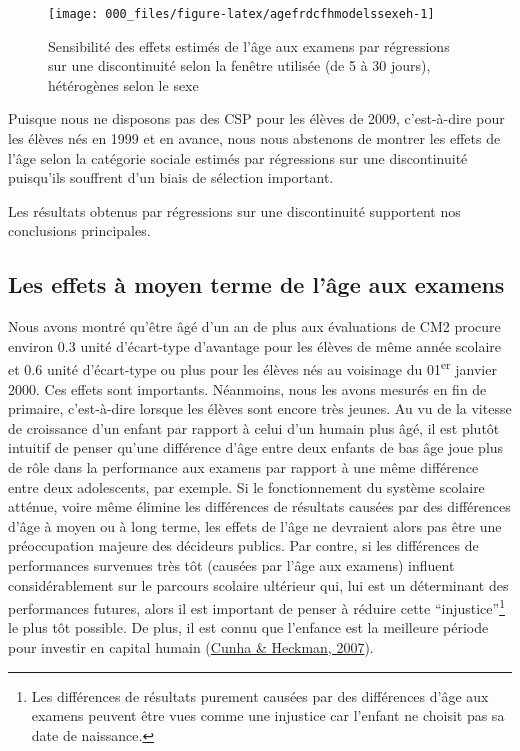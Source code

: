\documentclass[
]{book}
\begin{document}
\begin{figure}[H]

{\centering \texttt{[image: 000\_files/figure-latex/agefrdcfhmodelssexeh-1]} 

}

\caption{Sensibilité des effets estimés de l'âge aux examens par régressions sur une discontinuité selon la fenêtre utilisée (de 5 à 30 jours), hétérogènes selon le sexe}\label{fig:agefrdcfhmodelssexeh}
\end{figure}

\quad Puisque nous ne disposons pas des CSP pour les élèves de 2009, c'est-à-dire pour les élèves nés en 1999 et en avance, nous nous abstenons de montrer les effets de l'âge selon la catégorie sociale estimés par régressions sur une discontinuité puisqu'ils souffrent d'un biais de sélection important.

\quad Les résultats obtenus par régressions sur une discontinuité supportent nos conclusions principales.

\hypertarget{agemodelsmtres}{%
\subsection{Les effets à moyen terme de l'âge aux examens}\label{agemodelsmtres}}

Nous avons montré qu'être âgé d'un an de plus aux évaluations de CM2 procure environ 0.3 unité d'écart-type d'avantage pour les élèves de même année scolaire et 0.6 unité d'écart-type ou plus pour les élèves nés au voisinage du 01\textsuperscript{er} janvier 2000. Ces effets sont importants. Néanmoins, nous les avons mesurés en fin de primaire, c'est-à-dire lorsque les élèves sont encore très jeunes. Au vu de la vitesse de croissance d'un enfant par rapport à celui d'un humain plus âgé, il est plutôt intuitif de penser qu'une différence d'âge entre deux enfants de bas âge joue plus de rôle dans la performance aux examens par rapport à une même différence entre deux adolescents, par exemple. Si le fonctionnement du système scolaire atténue, voire même élimine les différences de résultats causées par des différences d'âge à moyen ou à long terme, les effets de l'âge ne devraient alors pas être une préoccupation majeure des décideurs publics. Par contre, si les différences de performances survenues très tôt (causées par l'âge aux examens) influent considérablement sur le parcours scolaire ultérieur qui, lui est un déterminant des performances futures, alors il est important de penser à réduire cette ``injustice''\footnote{Les différences de résultats purement causées par des différences d'âge aux examens peuvent être vues comme une injustice car l'enfant ne choisit pas sa date de naissance.} le plus tôt possible. De plus, il est connu que l'enfance est la meilleure période pour investir en capital humain (\protect\hyperlink{ref-CUN:HEC:07}{Cunha \& Heckman, 2007}).
\end{document}
